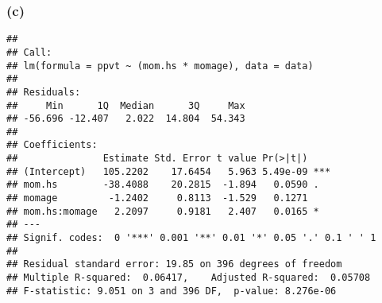 \documentclass[
]{article}
\newenvironment{Shaded}{\begin{snugshade}}{\end{snugshade}}
\newcommand{\AttributeTok}[1]{\textcolor[rgb]{0.77,0.63,0.00}{#1}}
\newcommand{\DecValTok}[1]{\textcolor[rgb]{0.00,0.00,0.81}{#1}}
\newcommand{\FunctionTok}[1]{\textcolor[rgb]{0.00,0.00,0.00}{#1}}
\newcommand{\NormalTok}[1]{#1}
\newcommand{\OtherTok}[1]{\textcolor[rgb]{0.56,0.35,0.01}{#1}}
\newcommand{\SpecialCharTok}[1]{\textcolor[rgb]{0.00,0.00,0.00}{#1}}
\begin{document}
\hypertarget{c-2}{%
\subsubsection{(c)}\label{c-2}}

\begin{Shaded}
\end{Shaded}

\begin{verbatim}
## 
## Call:
## lm(formula = ppvt ~ (mom.hs * momage), data = data)
## 
## Residuals:
##     Min      1Q  Median      3Q     Max 
## -56.696 -12.407   2.022  14.804  54.343 
## 
## Coefficients:
##               Estimate Std. Error t value Pr(>|t|)    
## (Intercept)   105.2202    17.6454   5.963 5.49e-09 ***
## mom.hs        -38.4088    20.2815  -1.894   0.0590 .  
## momage         -1.2402     0.8113  -1.529   0.1271    
## mom.hs:momage   2.2097     0.9181   2.407   0.0165 *  
## ---
## Signif. codes:  0 '***' 0.001 '**' 0.01 '*' 0.05 '.' 0.1 ' ' 1
## 
## Residual standard error: 19.85 on 396 degrees of freedom
## Multiple R-squared:  0.06417,    Adjusted R-squared:  0.05708 
## F-statistic: 9.051 on 3 and 396 DF,  p-value: 8.276e-06
\end{verbatim}
\end{document}
